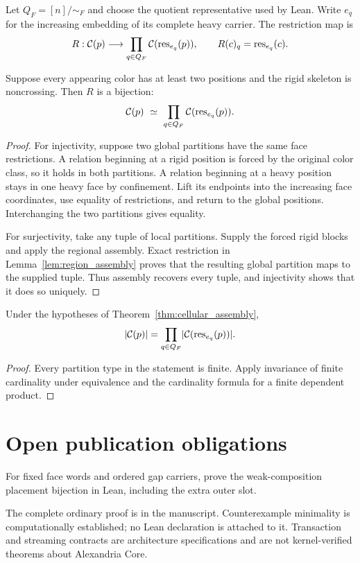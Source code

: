 Let $Q_F=[n]/{\sim_F}$ and choose the quotient representative used by Lean.
Write $e_q$ for the increasing embedding of its complete heavy carrier.
The restriction map is
\[
 R:\mathcal C(p)\longrightarrow\prod_{q\in Q_F}\mathcal C(\operatorname{res}_{e_q}(p)),
 \qquad R(c)_q=\operatorname{res}_{e_q}(c).
\]
\begin{theorem}\label{thm:cellular_assembly}
Suppose every appearing color has at least two positions and the rigid
skeleton is noncrossing. Then $R$ is a bijection:
\[
 \Cert(p)\ \simeq\ \prod_{q\in Q_F}\Cert(\Res_{e_q}(p)).
\]
\leanok
{}
\end{theorem}
\begin{proof}
For injectivity, suppose two global partitions have the same face
restrictions. A relation beginning at a rigid position is forced by the
original color class, so it holds in both partitions. A relation beginning
at a heavy position stays in one heavy face by confinement. Lift its endpoints
into the increasing face coordinates, use equality of restrictions, and
return to the global positions. Interchanging the two partitions gives
equality.

For surjectivity, take any tuple of local partitions. Supply the forced
rigid blocks and apply the regional assembly. Exact restriction in
Lemma~\ref{lem:region_assembly} proves that the resulting global partition
maps to the supplied tuple. Thus assembly recovers every tuple, and
injectivity shows that it does so uniquely.
\leanok
\end{proof}

\begin{corollary}\label{thm:certificate_product}
Under the hypotheses of Theorem~\ref{thm:cellular_assembly},
\[
 \lvert \mathcal C(p)\rvert
 =\prod_{q\in Q_F}\lvert \mathcal C(\operatorname{res}_{e_q}(p))\rvert.
\]
\leanok
{}
\end{corollary}
\begin{proof}
Every partition type in the statement is finite. Apply invariance of finite
cardinality under equivalence and the cardinality formula for a finite
dependent product.
\leanok
\end{proof}\section{Open publication obligations}
\begin{proposition}\label{prop:slots}\notready
For fixed face words and ordered gap carriers, prove the weak-composition
placement bijection in Lean, including the extra outer slot.
\end{proposition}
The complete ordinary proof is in the manuscript. Counterexample minimality
is computationally established; no Lean declaration is attached to it.
Transaction and streaming contracts are architecture specifications and
are not kernel-verified theorems about Alexandria Core.
